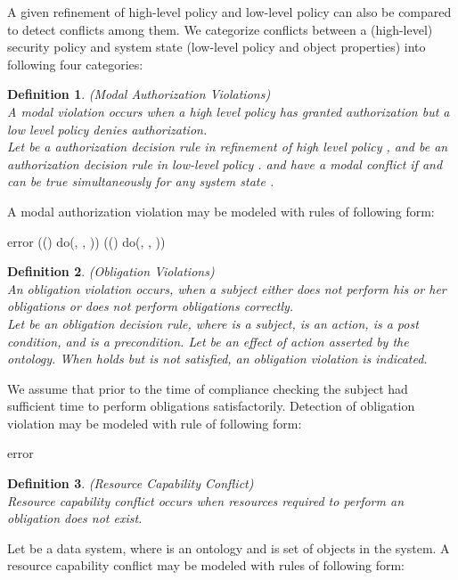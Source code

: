 \documentclass[12pt,journal,letterpaper,onecolumn]{IEEEtran}
\newtheorem{definition}{Definition}[section]
\begin{document}
A given refinement of high-level policy and low-level policy can 
also be compared to detect conflicts among them. 
We categorize conflicts between a (high-level) security policy and
system state (low-level policy and object properties) into following
four categories:

\begin{definition}(Modal Authorization Violations)\\
A modal violation occurs when a high level policy has granted
authorization but a low level policy denies authorization.\\
\noindent Let  be a authorization decision rule  in refinement of high level
policy , and  be an authorization decision rule  in low-level policy .
 and  have a modal conflict if 
and  can be true simultaneously for any system
state .
\end{definition}

A modal authorization violation may be modeled with rules of
following form:

 {\ttfamily error 
(() do(, , )) 
(() do(, , )) }

\begin{definition}(Obligation Violations)\\
An obligation violation occurs, when a subject either does not
perform his or her obligations or does not perform obligations
correctly.\\
 \noindent Let  be an obligation decision rule, where  is a subject, 
is an action,  is a post condition, and  is
a precondition. Let  be an effect of action  asserted by the
ontology. When  holds but  is not
satisfied, an obligation violation is indicated.
\end{definition}

We assume that prior to the time of compliance checking the subject
had sufficient time to perform obligations satisfactorily. Detection
of obligation violation may be modeled with rule of following form:

{\ttfamily error  }

\begin{definition}(Resource Capability Conflict)\\
Resource capability conflict occurs when resources required to
perform an obligation does not exist.
\end{definition}

Let  be a data system, where  is an ontology and  is
set of objects in the system. A resource capability conflict may be
modeled with rules of following form:
\end{document}
